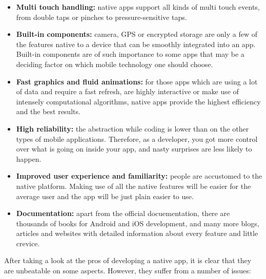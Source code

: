 \begin{itemize}
	\item \textbf{Multi touch handling:} native apps support all kinds of multi touch events, from double taps or pinches to pressure-sensitive taps.
	\item \textbf{Built-in components:} camera, GPS or encrypted storage are only a few of the features native to a device that can be smoothly integrated into an app. Built-in components are of such importance to some apps that may be a deciding factor on which mobile technology one should choose.
	\item \textbf{Fast graphics and fluid animations:} for those apps which are using a lot of data and require a fast refresh, are highly interactive or make use of intensely computational algorithms, native apps provide the highest efficiency and the best results.
	\item \textbf{High reliability:} the abstraction while coding is lower than on the other types of mobile applications. Therefore, as a developer, you got more control over what is going on inside your app, and nasty surprises are less likely to happen. 
	\item \textbf{Improved user experience and familiarity:} people are accustomed to the native platform. Making use of all the native features will be easier for the average user and the app will be just plain easier to use.
	\item \textbf{Documentation:} apart from the official docuementation, there are thousands of books for Android and iOS development, and many more blogs, articles and websites with detailed information about every feature and little crevice.
\end{itemize}

After taking a look at the pros of developing a native app, it is clear that they are unbeatable on some aspects. However, they suffer from a number of issues:

